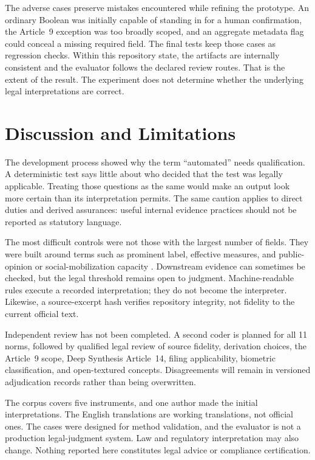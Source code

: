 \documentclass{IOS-Book-Article}
\begin{document}
The adverse cases preserve mistakes encountered while refining the prototype. An ordinary Boolean was initially capable of standing in for a human confirmation, the Article~9 exception was too broadly scoped, and an aggregate metadata flag could conceal a missing required field. The final tests keep those cases as regression checks. Within this repository state, the artifacts are internally consistent and the evaluator follows the declared review routes. That is the extent of the result. The experiment does not determine whether the underlying legal interpretations are correct.

\section{Discussion and Limitations}

The development process showed why the term ``automated'' needs qualification. A deterministic test says little about who decided that the test was legally applicable. Treating those questions as the same would make an output look more certain than its interpretation permits. The same caution applies to direct duties and derived assurances: useful internal evidence practices should not be reported as statutory language.

The most difficult controls were not those with the largest number of fields. They were built around terms such as prominent label, effective measures, and public-opinion or social-mobilization capacity \cite{aigcLabelingMeasures2025,deepSynthesisProvisions2022,genaiMeasures2023}. Downstream evidence can sometimes be checked, but the legal threshold remains open to judgment. Machine-readable rules execute a recorded interpretation; they do not become the interpreter. Likewise, a source-excerpt hash verifies repository integrity, not fidelity to the current official text.

Independent review has not been completed. A second coder is planned for all 11 norms, followed by qualified legal review of source fidelity, derivation choices, the Article~9 scope, Deep Synthesis Article~14, filing applicability, biometric classification, and open-textured concepts. Disagreements will remain in versioned adjudication records rather than being overwritten.

The corpus covers five instruments, and one author made the initial interpretations. The English translations are working translations, not official ones. The cases were designed for method validation, and the evaluator is not a production legal-judgment system. Law and regulatory interpretation may also change. Nothing reported here constitutes legal advice or compliance certification.
\end{document}
